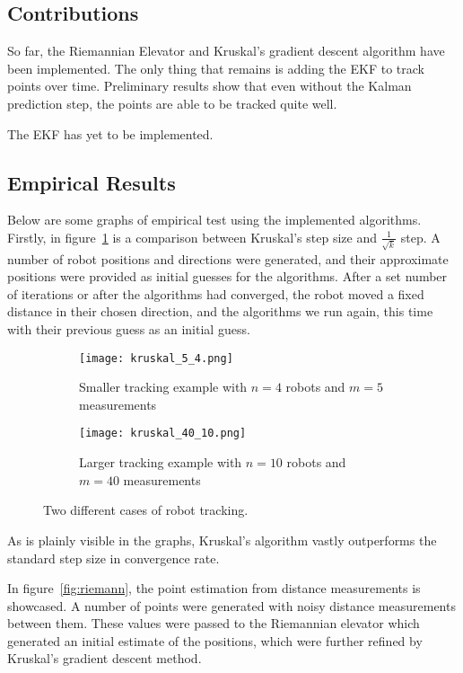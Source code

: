 \subsection{Contributions}
So far, the Riemannian Elevator and Kruskal's gradient descent algorithm have been implemented. The only thing that remains is adding the EKF to track points over time. Preliminary results show that even without the Kalman prediction step, the points are able to be tracked quite well. 

The EKF has yet to be implemented.
\subsection{Empirical Results}
Below are some graphs of empirical test using the implemented algorithms. Firstly, in figure~\ref{fig:kruskal} is a comparison between Kruskal's step size and $\frac{1}{\sqrt{k}}$ step. A number of robot positions and directions were generated, and their approximate positions were provided as initial guesses for the algorithms. After a set number of iterations or after the algorithms had converged, the robot moved a fixed distance in their chosen direction, and the algorithms we run again, this time with their previous guess as an initial guess.
\begin{figure}[ht]
    \centering
    \begin{subfigure}{\linewidth}
        \texttt{[image: kruskal\_5\_4.png]}
        \caption{Smaller tracking example with $n=4$ robots and $m=5$ measurements}
    \end{subfigure}
    \begin{subfigure}{\linewidth}
        \texttt{[image: kruskal\_40\_10.png]}
        \caption{Larger tracking example with $n=10$ robots and $m=40$ measurements}
    \end{subfigure}
    \caption{Two different cases of robot tracking. } \label{fig:kruskal}
\end{figure}

As is plainly visible in the graphs, Kruskal's algorithm vastly outperforms the standard step size in convergence rate. 

In figure~\ref{fig:riemann}, the point estimation from distance measurements is showcased. A number of points were generated with noisy distance measurements between them. These values were passed to the Riemannian elevator which generated an initial estimate of the positions, which were further refined by Kruskal's gradient descent method.


